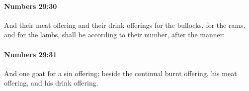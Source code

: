 		\paragraph{Numbers 29:30} %
			\label{NUMBERS-29-30}

			And their meat offering and their drink offerings for the bullocks, for the rams, and for the lambs, shall be according to their number, after the manner:


		\paragraph{Numbers 29:31} %
			\label{NUMBERS-29-31}

			And one goat for a sin offering; beside the continual burnt offering, his meat offering, and his drink offering.


